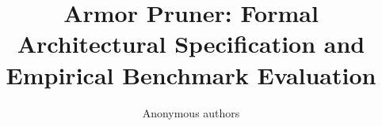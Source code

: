 \title{\textbf{Armor Pruner: Formal Architectural Specification and Empirical Benchmark Evaluation}}

\author{Anonymous authors}
